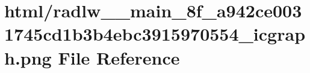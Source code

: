 \hypertarget{radlw____main__8f__a942ce0031745cd1b3b4ebc3915970554__icgraph_8png}{}\section{html/radlw\+\_\+\+\_\+main\+\_\+8f\+\_\+a942ce0031745cd1b3b4ebc3915970554\+\_\+icgraph.png File Reference}
\label{radlw____main__8f__a942ce0031745cd1b3b4ebc3915970554__icgraph_8png}
